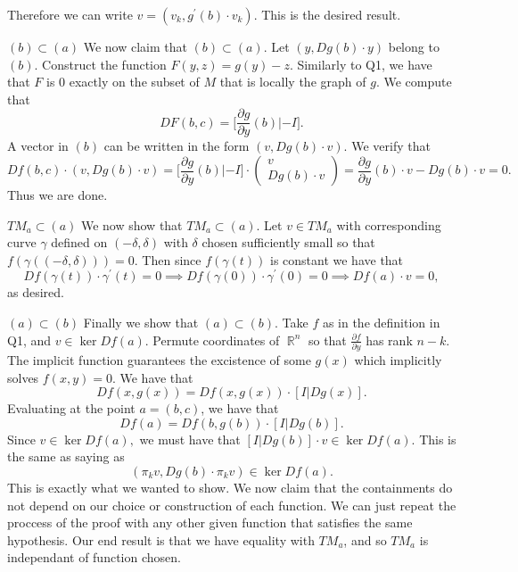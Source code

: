 \documentclass[letterpaper]{article}
\DeclareMathOperator{\R}{\mathbb{R}}
\begin{document}
\begin{description}
Therefore we can write $v = (v_k,g^\prime(b)\cdot v_k)$. This is the desired result. 
\item{$(b) \subset (a)$} \newline 
We now claim that $(b) \subset (a)$. Let $(y,Dg(b)\cdot y)$ belong to $(b)$. Construct the function $F(y,z) = g(y) - z$. 
Similarly to Q1, we have that $F$ is $0$ exactly on the subset of $M$ that is locally the graph of $g$. We compute that $$DF(b,c) = \Big[\frac{\partial g}{\partial y}(b) | -I \Big].$$ A vector in $(b)$ can be written in the form $(v, Dg(b)\cdot v).$ We verify that $$Df(b,c) \cdot (v, Dg(b)\cdot v) = \Big[\frac{\partial g}{\partial y}(b) | -I \Big]\cdot \begin{pmatrix}
    v \\ Dg(b)\cdot v
\end{pmatrix} = \frac{\partial g}{\partial y}(b) \cdot v - Dg(b)\cdot v = 0.$$
Thus we are done. 
\item{$TM_a \subset (a)$} \newline 
We now show that $TM_a \subset (a)$. Let $v\in TM_a$ with corresponding curve $\gamma$ defined on $(-\delta,\delta)$ with $\delta$ chosen sufficiently small so that $f(\gamma((-\delta, \delta))) = 0$. 
Then since $f(\gamma(t))$ is constant we have that $$Df(\gamma(t)) \cdot \gamma^\prime(t) = 0 \implies Df(\gamma(0))\cdot \gamma^\prime(0)=0 \implies Df(a)\cdot v = 0,$$ as desired. 
\item{$(a) \subset (b)$} \newline 
Finally we show that $(a) \subset(b). $ Take $f$ as in the definition in Q1, and $v\in \ker Df(a).$
Permute coordinates of $\R^n$ so that $\frac{\partial f}{\partial y}$ has rank $n-k$. 
The implicit function guarantees the excistence of some $g(x)$ which implicitly solves $f(x,y)=0$. We have that $$Df(x,g(x)) = Df(x,g(x))\cdot [I|Dg(x)].$$ Evaluating at the point $a=(b,c)$, we have that $$Df(a) = Df(b,g(b))\cdot [I|Dg(b)].$$ Since $v \in \ker Df(a),$ we must have that 
$[I|Dg(b)]\cdot v \in \ker Df(a).$ This is the same as saying as $$(\pi_k v, Dg(b) \cdot \pi_k v) \in \ker Df(a).$$ This is exactly what we wanted to show. 
We now claim that the containments do not depend on our choice or construction of each function. We can just repeat the proccess of the proof with any other given function that satisfies the same hypothesis.
Our end result is that we have equality with $TM_a$, and so $TM_a$ is independant of function chosen. 

\end{description}
\end{document}
